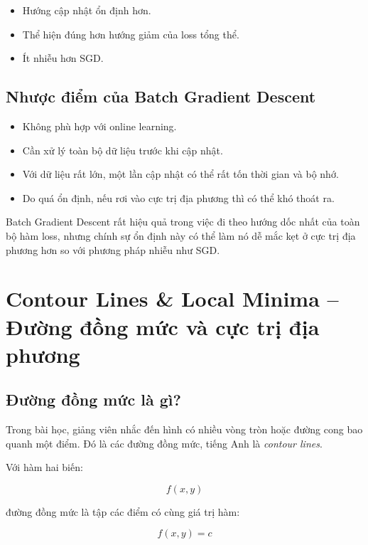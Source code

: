 \begin{itemize}
    \item Hướng cập nhật ổn định hơn.
    \item Thể hiện đúng hơn hướng giảm của loss tổng thể.
    \item Ít nhiễu hơn SGD.
\end{itemize}

\subsection{Nhược điểm của Batch Gradient Descent}

\begin{itemize}
    \item Không phù hợp với online learning.
    \item Cần xử lý toàn bộ dữ liệu trước khi cập nhật.
    \item Với dữ liệu rất lớn, một lần cập nhật có thể rất tốn thời gian và bộ nhớ.
    \item Do quá ổn định, nếu rơi vào cực trị địa phương thì có thể khó thoát ra.
\end{itemize}

\begin{luuy}
Batch Gradient Descent rất hiệu quả trong việc đi theo hướng dốc nhất của toàn bộ hàm loss, nhưng chính sự ổn định này có thể làm nó dễ mắc kẹt ở cực trị địa phương hơn so với phương pháp nhiễu như SGD.
\end{luuy}

\section{Contour Lines \& Local Minima -- Đường đồng mức và cực trị địa phương}

\subsection{Đường đồng mức là gì?}

Trong bài học, giảng viên nhắc đến hình có nhiều vòng tròn hoặc đường cong bao quanh một điểm. Đó là các đường đồng mức, tiếng Anh là \textit{contour lines}.

Với hàm hai biến:

\[
    f(x,y)
\]

đường đồng mức là tập các điểm có cùng giá trị hàm:

\[
    f(x,y)=c
\]

